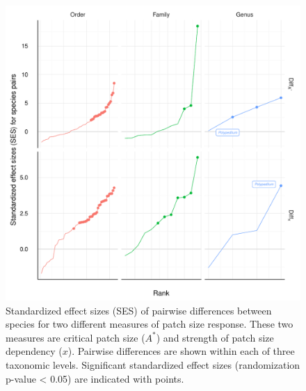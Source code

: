 \begin{figure}[htbp]
\centering
\includegraphics[width=5.5in]{figures/ses_rank.pdf}
\caption{Standardized effect sizes (SES) of pairwise differences
between species for two different measures of patch size response.
These two measures are critical patch size (\(A^{*}\)) and strength of
patch size dependency (\(x\)). Pairwise differences are shown within
each of three taxonomic levels. Significant standardized effect sizes
(randomization p-value \textless{} 0.05) are indicated with points.}
\end{figure}

